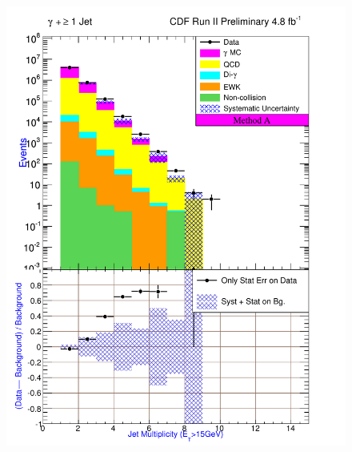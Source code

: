 \documentclass[12pt,twoside,letterpaper,doublespace]{article}
\begin{document}
\begin{figure}[h!]
{\includegraphics[keepaspectratio=true, scale=\figScale]{G30Jets_MtdA_plot1_NJet.pdf}\label{fig:pjSetTwo:NJet}}

\end{figure}
\end{document}
